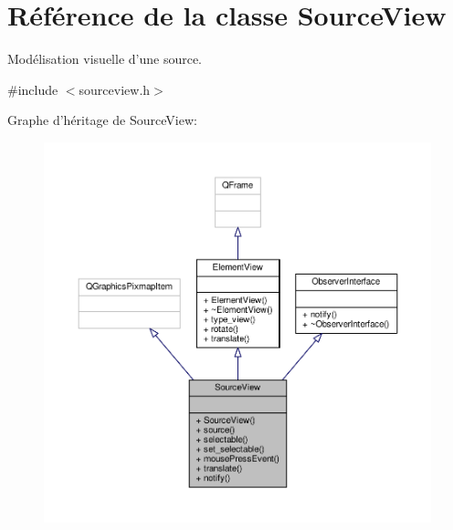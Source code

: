 \hypertarget{classSourceView}{\section{Référence de la classe Source\+View}
\label{classSourceView}
}


Modélisation visuelle d’une source.  




{\ttfamily \#include $<$sourceview.\+h$>$}



Graphe d'héritage de Source\+View\+:\nopagebreak
\begin{figure}[H]
\begin{center}
\leavevmode
\includegraphics[width=350pt]{de/ddc/classSourceView__inherit__graph}
\end{center}
\end{figure}


